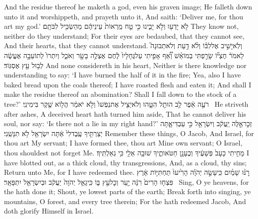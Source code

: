 {And the residue thereof he maketh a god, even his graven image; He falleth down unto it and worshippeth, and prayeth unto it, And saith: ‘Deliver me, for thou art my god.’}
{לֹ֥א יָדְע֖וּ וְלֹ֣א יָבִ֑ינוּ כִּ֣י טַ֤ח מֵֽרְאוֹת֙ עֵינֵיהֶ֔ם מֵהַשְׂכִּ֖יל לִבֹּתָֽם׃}
{They know not, neither do they understand; For their eyes are bedaubed, that they cannot see, And their hearts, that they cannot understand.}
{וְלֹֽא\maqqaf יָשִׁ֣יב אֶל\maqqaf לִבּ֗וֹ וְלֹ֨א דַ֥עַת וְלֹא\maqqaf תְבוּנָה֮ לֵאמֹר֒ חֶצְי֞וֹ שָׂרַ֣פְתִּי בְמוֹ\maqqaf אֵ֗שׁ וְ֠אַ֠ף אָפִ֤יתִי עַל\maqqaf גֶּחָלָיו֙ לֶ֔חֶם אֶצְלֶ֥ה בָשָׂ֖ר וְאֹכֵ֑ל וְיִתְרוֹ֙ לְתוֹעֵבָ֣ה אֶעֱשֶׂ֔ה לְב֥וּל עֵ֖ץ אֶסְגּֽוֹד׃}
{And none considereth in his heart, Neither is there knowledge nor understanding to say: ‘I have burned the half of it in the fire; Yea, also I have baked bread upon the coals thereof; I have roasted flesh and eaten it; And shall I make the residue thereof an abomination? Shall I fall down to the stock of a tree?’}
{רֹעֶ֣ה אֵ֔פֶר לֵ֥ב הוּתַ֖ל הִטָּ֑הוּ וְלֹא\maqqaf יַצִּ֤יל אֶת\maqqaf נַפְשׁוֹ֙ וְלֹ֣א יֹאמַ֔ר הֲל֥וֹא שֶׁ֖קֶר בִּימִינִֽי׃ \setuma }
{He striveth after ashes, A deceived heart hath turned him aside, That he cannot deliver his soul, nor say: ‘Is there not a lie in my right hand?’}
{זְכׇר\maqqaf אֵ֣לֶּה יַֽעֲקֹ֔ב וְיִשְׂרָאֵ֖ל כִּ֣י עַבְדִּי\maqqaf אָ֑תָּה יְצַרְתִּ֤יךָ עֶֽבֶד\maqqaf לִי֙ אַ֔תָּה יִשְׂרָאֵ֖ל לֹ֥א תִנָּשֵֽׁנִי׃}
{Remember these things, O Jacob, And Israel, for thou art My servant; I have formed thee, thou art Mine own servant; O Israel, thou shouldest not forget Me.}
{מָחִ֤יתִי כָעָב֙ פְּשָׁעֶ֔יךָ וְכֶעָנָ֖ן חַטֹּאותֶ֑יךָ שׁוּבָ֥ה אֵלַ֖י כִּ֥י גְאַלְתִּֽיךָ׃}
{I have blotted out, as a thick cloud, thy transgressions, And, as a cloud, thy sins; Return unto Me, for I have redeemed thee.}
{רׇנּ֨וּ שָׁמַ֜יִם כִּֽי\maqqaf עָשָׂ֣ה יְהֹוָ֗ה הָרִ֙יעוּ֙ תַּחְתִּיּ֣וֹת אָ֔רֶץ פִּצְח֤וּ הָרִים֙ רִנָּ֔ה יַ֖עַר וְכׇל\maqqaf עֵ֣ץ בּ֑וֹ כִּֽי\maqqaf גָאַ֤ל יְהֹוָה֙ יַעֲקֹ֔ב וּבְיִשְׂרָאֵ֖ל יִתְפָּאָֽר׃ \setuma }
{Sing, O ye heavens, for the \lord\space hath done it; Shout, ye lowest parts of the earth; Break forth into singing, ye mountains, O forest, and every tree therein; For the \lord\space hath redeemed Jacob, And doth glorify Himself in Israel.}
\newperek
{}
\label{haft_25}
